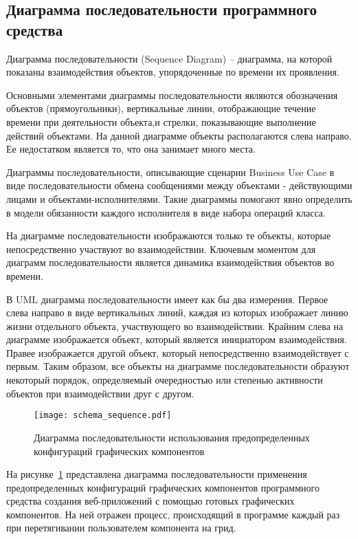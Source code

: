 \subsection{Диаграмма последовательности программного средства}
\label{sec:modeling:sequence}

Диаграмма последовательности (Sequence Diagram) – диаграмма, на которой показаны взаимодействия объектов, упорядоченные по времени их проявления.

Основными элементами диаграммы последовательности являются обозначения объектов (прямоугольники), вертикальные линии, отображающие течение времени при деятельности объекта,и стрелки, показывающие выполнение действий объектами. На данной диаграмме объекты располагаются слева направо. Ее недостатком является то, что она занимает много места.

Диаграммы последовательности, описывающие сценарии Business Use Case в виде последовательности обмена сообщениями между объектами - действующими лицами и объектами-исполнителями. Такие диаграммы помогают явно определить в модели обязанности каждого исполнителя в виде набора операций класса.

На диаграмме последовательности изображаются только те объекты, которые непосредственно участвуют во взаимодействии. Ключевым моментом для диаграмм последовательности является динамика взаимодействия объектов во времени.

В UML диаграмма последовательности имеет как бы два измерения. Первое слева направо в виде вертикальных линий, каждая из которых изображает линию жизни отдельного объекта, участвующего во взаимодействии. Крайним слева на диаграмме изображается объект, который является инициатором взаимодействия. Правее изображается другой объект, который непосредственно взаимодействует с первым. Таким образом, все объекты на диаграмме последовательности образуют некоторый порядок, определяемый очередностью или степенью активности объектов при взаимодействии друг с другом.

\begin{figure}[ht]
\centering
    \texttt{[image: schema\_sequence.pdf]}
    \caption{Диаграмма последовательности использования предопределенных конфигураций графических компонентов}
    \label{sec:design:sequence_diagram}
\end{figure}

На рисунке~\ref{sec:design:sequence_diagram} представлена диаграмма последовательности применения предопределенных конфигураций графических компонентов программного средства создания веб-приложений с помощью готовых графических компонентов. 
На ней отражен процесс, происходящий в программе каждый раз при перетягивании пользователем компонента на грид.\pagebreak

